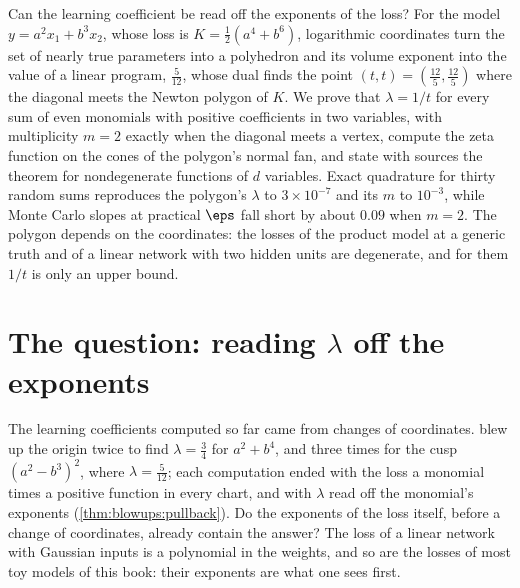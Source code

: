 \begin{refsection}

\begin{chaptersummary}
Can the learning coefficient be read off the exponents of the loss? For the model $y=a^2x_1+b^3x_2$, whose loss is $K=\frac12(a^4+b^6)$, logarithmic coordinates turn the set of nearly true parameters into a polyhedron and its volume exponent into the value of a linear program, $\frac5{12}$, whose dual finds the point $(t,t)=(\frac{12}5,\frac{12}5)$ where the diagonal meets the Newton polygon of $K$. We prove that $\lambda=1/t$ for every sum of even monomials with positive coefficients in two variables, with multiplicity $m=2$ exactly when the diagonal meets a vertex, compute the zeta function on the cones of the polygon's normal fan, and state with sources the theorem for nondegenerate functions of $d$ variables. Exact quadrature for thirty random sums reproduces the polygon's $\lambda$ to $3\times10^{-7}$ and its $m$ to $10^{-3}$, while Monte Carlo slopes at practical $\eps$ fall short by about $0.09$ when $m=2$. The polygon depends on the coordinates: the losses of the product model at a generic truth and of a linear network with two hidden units are degenerate, and for them $1/t$ is only an upper bound.
\end{chaptersummary}

\section{The question: reading \texorpdfstring{$\lambda$}{lambda} off the exponents}\label{sec:newton:question}

The learning coefficients computed so far came from changes of coordinates.  blew up the origin twice to find $\lambda=\frac34$ for $a^2+b^4$, and three times for the cusp $(a^2-b^3)^2$, where $\lambda=\frac5{12}$; each computation ended with the loss a monomial times a positive function in every chart, and with $\lambda$ read off the monomial's exponents (\cref{thm:blowups:pullback}). Do the exponents of the loss itself, before a change of coordinates, already contain the answer? The loss of a linear network with Gaussian inputs is a polynomial in the weights, and so are the losses of most toy models of this book: their exponents are what one sees first.


\end{refsection}
